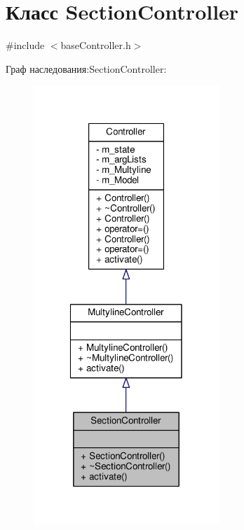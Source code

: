 \hypertarget{class_section_controller}{\section{Класс Section\-Controller}
\label{class_section_controller}
}


{\ttfamily \#include $<$base\-Controller.\-h$>$}



Граф наследования\-:Section\-Controller\-:
\nopagebreak
\begin{figure}[H]
\begin{center}
\leavevmode
\includegraphics[width=198pt]{class_section_controller__inherit__graph}
\end{center}
\end{figure}


